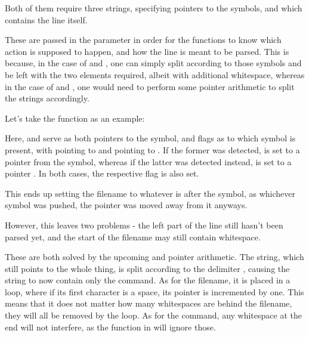 \documentclass[12pt, a4paper]{report}
\begin{document}
                Both of them require three strings,  specifying pointers
                to the symbols, and  which contains the line itself.

                These are passed in the parameter in order for the functions to know
                which action is supposed to happen, and how the line is meant to be
                parsed. This is because, in the case of \tx{<} and \tx{>}, one can 
                simply split according to those symbols and be left with the two
                elements required, albeit with additional whitespace, whereas in the
                case of \tx{<<<} and \tx{>>}, one would need to perform some 
                pointer arithmetic to split the strings accordingly.

                Let's take the  function as an example:

                \begingroup
                \fontsize{10pt}{10pt}\selectfont
                \endgroup
                Here,  and  serve as both pointers to
                the symbol, and flags as to which symbol is present, with
                 pointing to \tx{<<<} and  pointing to
                \tx{<}. If the former was detected,  is set to a pointer
                 from the symbol, whereas if the latter
                was detected instead,  is set to a pointer
                . In both cases, the respective flag is also set.

                This ends up setting the filename to whatever is after the symbol, as
                whichever symbol was pushed, the pointer was moved away from it anyways.

                However, this leaves two problems - the left part of the line still
                hasn't been parsed yet, and the start of the filename may still
                contain whitespace.

                These are both solved by the upcoming  and pointer arithmetic.
                The  string, which still points to the whole thing, is split
                according to the \tx{<} delimiter , causing the
                 string to now contain only the command. As for the filename,
                it is placed in a loop, where if its first character is a space, its
                pointer is incremented by one. This means that it does not matter how
                many whitespaces are behind the filename, they will all be removed by the
                loop. As for the command, any whitespace at the end will not interfere,
                as the  function in  will ignore those.
\end{document}
